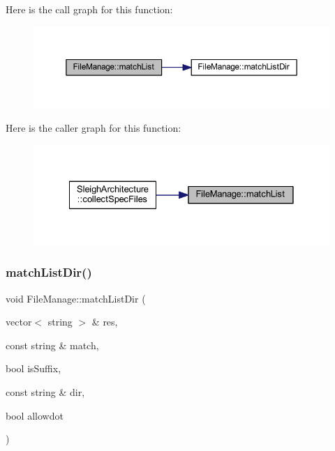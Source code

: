 Here is the call graph for this function\+:
\nopagebreak
\begin{figure}[H]
\begin{center}
\leavevmode
\includegraphics[width=350pt]{class_file_manage_aeba79cb34d9727c1660d1710fd356e30_cgraph}
\end{center}
\end{figure}
Here is the caller graph for this function\+:
\nopagebreak
\begin{figure}[H]
\begin{center}
\leavevmode
\includegraphics[width=328pt]{class_file_manage_aeba79cb34d9727c1660d1710fd356e30_icgraph}
\end{center}
\end{figure}
\mbox{\label{class_file_manage_ab0a82bdd34c86126156263e732bcbca4}} 
\subsubsection{\texorpdfstring{matchListDir()}{matchListDir()}}
{\footnotesize\ttfamily void File\+Manage\+::match\+List\+Dir (\begin{DoxyParamCaption}\item[{vector$<$ string $>$ \&}]{res,  }\item[{const string \&}]{match,  }\item[{bool}]{is\+Suffix,  }\item[{const string \&}]{dir,  }\item[{bool}]{allowdot }\end{DoxyParamCaption})\hspace{0.3cm}{\ttfamily [static]}}



